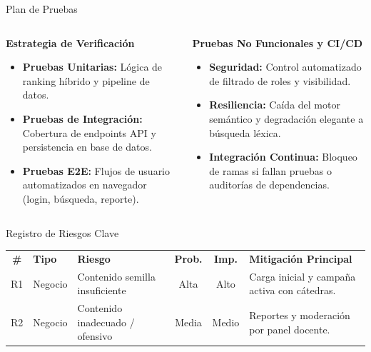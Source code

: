 \documentclass[11pt,aspectratio=169]{beamer}
\renewcommand{\arraystretch}{1.1}
\newcommand{\thead}[1]{{\color{white}\bfseries #1}}
\begin{document}
\begin{frame}{Plan de Pruebas}
  \small
  \begin{columns}[T]
    \begin{column}{0.48\textwidth}
      {\headingfont\bfseries\color{brandlt}Estrategia de Verificación}\\[0.15cm]
      \begin{itemize}
        \item \textbf{Pruebas Unitarias:} Lógica de ranking híbrido y pipeline de datos.
        \item \textbf{Pruebas de Integración:} Cobertura de endpoints API y persistencia en base de datos.
        \item \textbf{Pruebas E2E:} Flujos de usuario automatizados en navegador (login, búsqueda, reporte).
      \end{itemize}
    \end{column}

    \begin{column}{0.48\textwidth}
      {\headingfont\bfseries\color{brandlt}Pruebas No Funcionales y CI/CD}\\[0.15cm]
      \begin{itemize}
        \item \textbf{Seguridad:} Control automatizado de filtrado de roles y visibilidad.
        \item \textbf{Resiliencia:} Caída del motor semántico y degradación elegante a búsqueda léxica.
        \item \textbf{Integración Continua:} Bloqueo de ramas si fallan pruebas o auditorías de dependencias.
      \end{itemize}
    \end{column}
  \end{columns}
\end{frame}


\begin{frame}{Registro de Riesgos Clave}
  \centering
  \renewcommand{\arraystretch}{1.2}
  \setlength{\tabcolsep}{3pt}
  \scriptsize
  \begin{tabularx}{\textwidth}{c p{1.6cm} L c c L}
    \thead{\#} & \thead{Tipo} & \thead{Riesgo} & \thead{Prob.} & \thead{Imp.} & \thead{Mitigación Principal} \\
    R1 & Negocio & Contenido semilla insuficiente & Alta & Alto & Carga inicial y campaña activa con cátedras. \\
    R2 & Negocio & Contenido inadecuado / ofensivo & Media & Medio & Reportes y moderación por panel docente. \\
    \bottomrule
  \end{tabularx}
\end{frame}
\end{document}
